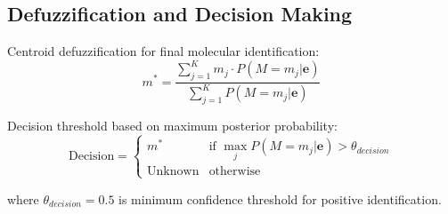 \subsection{Defuzzification and Decision Making}

Centroid defuzzification for final molecular identification:
\begin{equation}
m^* = \frac{\sum_{j=1}^K m_j \cdot P(M = m_j | \mathbf{e})}{\sum_{j=1}^K P(M = m_j | \mathbf{e})}
\end{equation}

Decision threshold based on maximum posterior probability:
\begin{equation}
\text{Decision} = \begin{cases}
m^* & \text{if } \max_j P(M = m_j | \mathbf{e}) > \theta_{decision} \\
\text{Unknown} & \text{otherwise}
\end{cases}
\end{equation}

where $\theta_{decision} = 0.5$ is minimum confidence threshold for positive identification.
